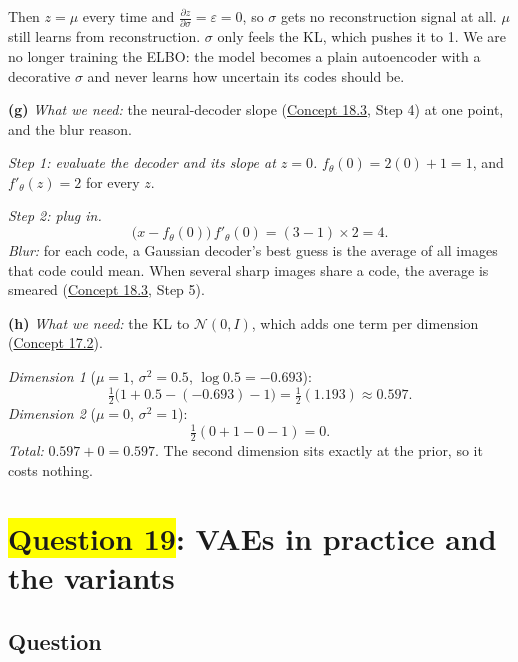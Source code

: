 \documentclass[12pt,a4paper]{article}
\begin{document}
Then $z=\mu$ every time and $\frac{\partial z}{\partial\sigma}=\varepsilon=0$, so $\sigma$ gets no reconstruction signal at all. $\mu$ still learns from reconstruction. $\sigma$ only feels the KL, which pushes it to 1. We are no longer training the ELBO: the model becomes a plain autoencoder with a decorative $\sigma$ and never learns how uncertain its codes should be.

\textbf{(g)} \emph{What we need:} the neural-decoder slope (\hyperref[c18-3]{Concept 18.3}, Step 4) at one point, and the blur reason.

\emph{Step 1: evaluate the decoder and its slope at $z=0$.} $f_\theta(0)=2(0)+1=1$, and $f'_\theta(z)=2$ for every $z$.

\emph{Step 2: plug in.}
\[
\big(x-f_\theta(0)\big)\,f'_\theta(0)=(3-1)\times2=4 .
\]
\emph{Blur:} for each code, a Gaussian decoder's best guess is the average of all images that code could mean. When several sharp images share a code, the average is smeared (\hyperref[c18-3]{Concept 18.3}, Step 5).

\textbf{(h)} \emph{What we need:} the KL to $\mathcal{N}(0,I)$, which adds one term per dimension (\hyperref[c17-2]{Concept 17.2}).

\emph{Dimension 1} ($\mu=1$, $\sigma^2=0.5$, $\log0.5=-0.693$):
\[
\tfrac12\big(1+0.5-(-0.693)-1\big)=\tfrac12(1.193)\approx0.597 .
\]
\emph{Dimension 2} ($\mu=0$, $\sigma^2=1$):
\[
\tfrac12(0+1-0-1)=0 .
\]
\emph{Total:} $0.597+0=0.597$. The second dimension sits exactly at the prior, so it costs nothing.
\newpage
\section{\texorpdfstring{\colorbox{yellow}{Question 19}}{Question 19}: VAEs in practice and the variants}

\subsection{Question}
\end{document}
